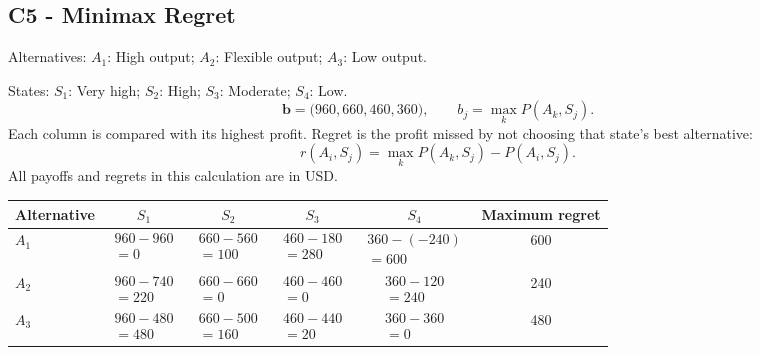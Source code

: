 \subsection*{C5 - Minimax Regret }
\label{sol:bakery-output-c5}
Alternatives: $A_1$: High output; $A_2$: Flexible output; $A_3$: Low output.\par
States: $S_1$: Very high; $S_2$: High; $S_3$: Moderate; $S_4$: Low.
\[\boldsymbol{b}=\bigl(960,660,460,360\bigr),\qquad b_j=\max_k P(A_k,S_j).\]
Each column is compared with its highest profit. Regret is the profit missed by not choosing that state's best alternative:
\[r(A_i,S_j)=\max_k P(A_k,S_j)-P(A_i,S_j).\]
All payoffs and regrets in this calculation are in USD.
\begin{center}
\begin{tabular}{@{}lccccc@{}}\toprule
Alternative & $S_1$ & $S_2$ & $S_3$ & $S_4$ & Maximum regret\\\midrule
$A_1$ & $\begin{gathered}960-960\\=0\end{gathered}$ & $\begin{gathered}660-560\\=100\end{gathered}$ & $\begin{gathered}460-180\\=280\end{gathered}$ & $\begin{gathered}360-(-240)\\=600\end{gathered}$ & 600\\
$A_2$ & $\begin{gathered}960-740\\=220\end{gathered}$ & $\begin{gathered}660-660\\=0\end{gathered}$ & $\begin{gathered}460-460\\=0\end{gathered}$ & $\begin{gathered}360-120\\=240\end{gathered}$ & 240\\
$A_3$ & $\begin{gathered}960-480\\=480\end{gathered}$ & $\begin{gathered}660-500\\=160\end{gathered}$ & $\begin{gathered}460-440\\=20\end{gathered}$ & $\begin{gathered}360-360\\=0\end{gathered}$ & 480\\
\bottomrule\end{tabular}
\end{center}
